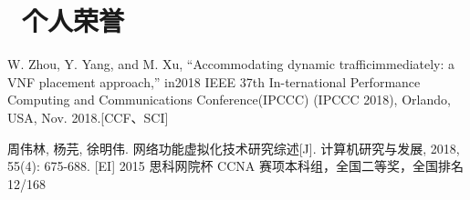 \documentclass{resume}
\begin{document}
\section{\faHeartO\ 个人荣誉}

{ W.  Zhou,  Y.  Yang,  and  M.  Xu,  “Accommodating  dynamic  trafficimmediately:  a  VNF  placement  approach,”  in2018 IEEE 37th In-ternational Performance Computing and Communications Conference(IPCCC) (IPCCC 2018), Orlando, USA, Nov. 2018.[CCF、SCI]}

{ 周伟林, 杨芫, 徐明伟. 网络功能虚拟化技术研究综述[J]. 计算机研究与发展, 2018, 55(4): 675-688. [EI]}
{2015 思科网院杯 CCNA 赛项本科组，全国二等奖，全国排名 12/168}
\end{document}
